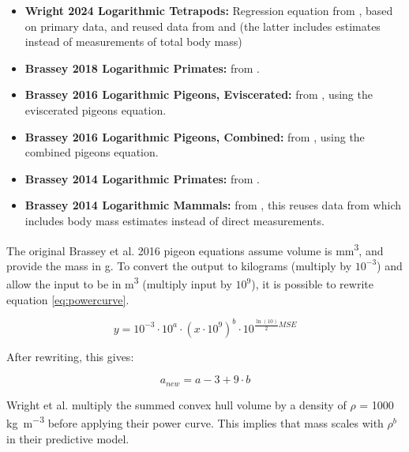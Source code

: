 \documentclass{article}
\begin{document}
\begin{itemize}
    \item \textbf{Wright 2024 Logarithmic Tetrapods:} Regression equation from \cite{wrightVolumetricElementscalingMass2024}, based on primary data, and reused data from \cite{coathamConvexHullEstimation2021} and \cite{sellersMinimumConvexHull2012} (the latter includes estimates instead of measurements of total body mass)
    \item \textbf{Brassey 2018 Logarithmic Primates:} from \cite{brasseyVolumetricTechniqueFossil2018}.
    \item \textbf{Brassey 2016 Logarithmic Pigeons, Eviscerated:} from \cite{brasseyConvexhullMassEstimates2016}, using the eviscerated pigeons equation.
    \item \textbf{Brassey 2016 Logarithmic Pigeons, Combined:} from \cite{brasseyConvexhullMassEstimates2016}, using the combined pigeons equation.
    \item \textbf{Brassey 2014 Logarithmic Primates:} from \cite{brasseyScalingConvexHull2014}.
    \item \textbf{Brassey 2014 Logarithmic Mammals:} from \cite{brasseyScalingConvexHull2014}, this reuses data from \cite{sellersMinimumConvexHull2012} which includes body mass estimates instead of direct measurements.
\end{itemize}

The original Brassey et al. 2016 \cite{brasseyConvexhullMassEstimates2016} pigeon equations assume volume is  \si{mm^3}, and provide the mass in \si{g}. To convert the output to kilograms (multiply by \(10^{-3}\)) and allow the input to be in \si{m^3} (multiply input by \(10^9\)), it is possible to rewrite equation \ref{eq:powercurve}.

\begin{equation}
y = 10^{-3} \cdot 10^a \cdot (x \cdot 10^9 )^{b} \cdot 10^{\frac{\ln(10)}{2} MSE }
\end{equation}

After rewriting, this gives:

\begin{equation}
    a_{new} = a - 3 + 9\cdot b
\end{equation}

Wright et al. \cite{wrightVolumetricElementscalingMass2024} multiply the summed convex hull volume by a density of \(\rho\) = 1000 \si{kg m^{-3}} before applying their power curve. This implies that mass scales with \(\rho^b\) in their predictive model.
\end{document}
